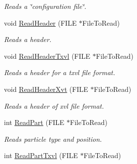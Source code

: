 \begin{DoxyCompactItemize}
\begin{DoxyCompactList}\small\item\em \-Reads a \char`\"{}configuration file\char`\"{}. \end{DoxyCompactList}\item 
\hypertarget{classVarData_a736de4373227d565d6f180ab22d2d0b6}{void \hyperlink{classVarData_a736de4373227d565d6f180ab22d2d0b6}{\-Read\-Header} (\-F\-I\-L\-E $\ast$\-File\-To\-Read)}\label{classVarData_a736de4373227d565d6f180ab22d2d0b6}

\begin{DoxyCompactList}\small\item\em \-Reads a header. \end{DoxyCompactList}\item 
\hypertarget{classVarData_ac1814e547141bc5cd56849c70bec46e0}{void \hyperlink{classVarData_ac1814e547141bc5cd56849c70bec46e0}{\-Read\-Header\-Txvl} (\-F\-I\-L\-E $\ast$\-File\-To\-Read)}\label{classVarData_ac1814e547141bc5cd56849c70bec46e0}

\begin{DoxyCompactList}\small\item\em \-Reads a header for a txvl file format. \end{DoxyCompactList}\item 
\hypertarget{classVarData_a58e4738e2a7b25eaafbe3e2c623a04ae}{void \hyperlink{classVarData_a58e4738e2a7b25eaafbe3e2c623a04ae}{\-Read\-Header\-Xvt} (\-F\-I\-L\-E $\ast$\-File\-To\-Read)}\label{classVarData_a58e4738e2a7b25eaafbe3e2c623a04ae}

\begin{DoxyCompactList}\small\item\em \-Reads a header of xvl file format. \end{DoxyCompactList}\item 
\hypertarget{classVarData_a0a49b9b416c10795fd8f0b6ec59fbf78}{int \hyperlink{classVarData_a0a49b9b416c10795fd8f0b6ec59fbf78}{\-Read\-Part} (\-F\-I\-L\-E $\ast$\-File\-To\-Read)}\label{classVarData_a0a49b9b416c10795fd8f0b6ec59fbf78}

\begin{DoxyCompactList}\small\item\em \-Reads particle type and position. \end{DoxyCompactList}\item 
\hypertarget{classVarData_ad69fff0c68c8644198d6fedfb6341fa3}{int \hyperlink{classVarData_ad69fff0c68c8644198d6fedfb6341fa3}{\-Read\-Part\-Txvl} (\-F\-I\-L\-E $\ast$\-File\-To\-Read)}\label{classVarData_ad69fff0c68c8644198d6fedfb6341fa3}


\end{DoxyCompactItemize}
